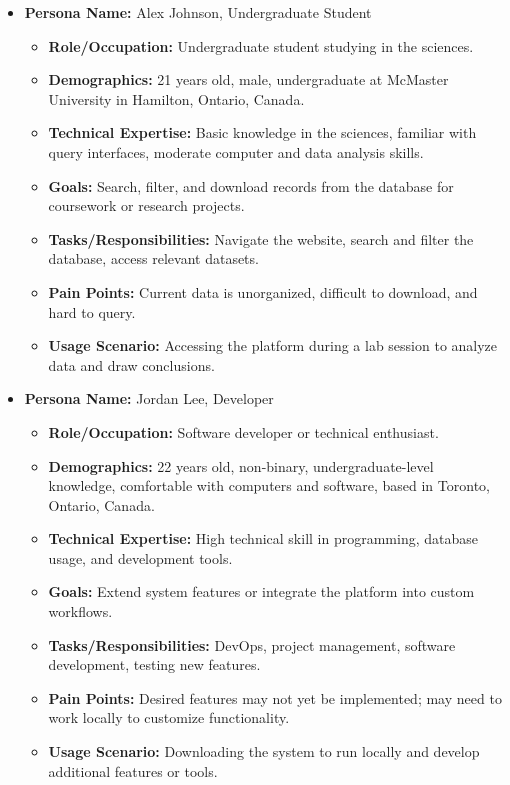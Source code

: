 \documentclass[12pt]{article}
\begin{document}
\begin{itemize}
    \item \textbf{Persona Name:} Alex Johnson, Undergraduate Student
    \begin{itemize}
        \item \textbf{Role/Occupation:} Undergraduate student studying in the sciences.
        \item \textbf{Demographics:} 21 years old, male, undergraduate at McMaster University in Hamilton, Ontario, Canada.
        \item \textbf{Technical Expertise:} Basic knowledge in the sciences, familiar with query interfaces, moderate computer and data analysis skills.
        \item \textbf{Goals:} Search, filter, and download records from the database for coursework or research projects.
        \item \textbf{Tasks/Responsibilities:} Navigate the website, search and filter the database, access relevant datasets.
        \item \textbf{Pain Points:} Current data is unorganized, difficult to download, and hard to query.
        \item \textbf{Usage Scenario:} Accessing the platform during a lab session to analyze data and draw conclusions.
    \end{itemize}

    \item \textbf{Persona Name:} Jordan Lee, Developer
    \begin{itemize}
        \item \textbf{Role/Occupation:} Software developer or technical enthusiast.
        \item \textbf{Demographics:} 22 years old, non-binary, undergraduate-level knowledge, comfortable with computers and software, based in Toronto, Ontario, Canada.
        \item \textbf{Technical Expertise:} High technical skill in programming, database usage, and development tools.
        \item \textbf{Goals:} Extend system features or integrate the platform into custom workflows.
        \item \textbf{Tasks/Responsibilities:} DevOps, project management, software development, testing new features.
        \item \textbf{Pain Points:} Desired features may not yet be implemented; may need to work locally to customize functionality.
        \item \textbf{Usage Scenario:} Downloading the system to run locally and develop additional features or tools.
    \end{itemize}


\end{itemize}
\end{document}
